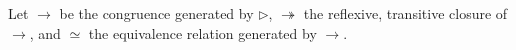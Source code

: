 \begin{code}
\>[2] \AgdaSymbol{:}  \AgdaSymbol{\{}\AgdaSymbol{\}} \AgdaSymbol{\{}\AgdaSymbol{\}} \AgdaSymbol{\{}\AgdaSymbol{\}} \AgdaSymbol{\{}\AgdaSymbol{\}} \AgdaSymbol{\{}\AgdaSymbol{\}} \AgdaSymbol{\{}\AgdaSymbol{\}} \AgdaSymbol{\{}\AgdaSymbol{\}}   \AgdaSymbol{\{}\AgdaSymbol{\}}  \AgdaSymbol{(} \AgdaInductiveConstructor{,,}  \AgdaInductiveConstructor{,,}  \AgdaSymbol{(}  \AgdaSymbol{)} \AgdaInductiveConstructor{,,}    \AgdaInductiveConstructor{,,} \AgdaSymbol{)} \AgdaSymbol{(}   \AgdaSymbol{(}  \AgdaSymbol{)}       \AgdaSymbol{)}\<%
\end{code}

Let $\rightarrow$ be the congruence generated by $\rhd$, $\twoheadrightarrow$ the reflexive, transitive closure of $\rightarrow$, and $\simeq$ the equivalence relation generated by $\rightarrow$.

